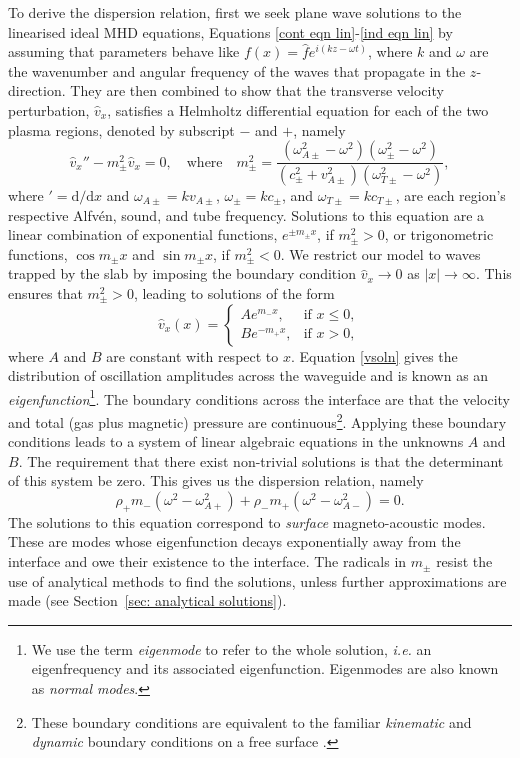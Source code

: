 To derive the dispersion relation, first we seek plane wave solutions to the linearised ideal MHD equations, Equations \eqref{cont eqn lin}-\eqref{ind eqn lin} by assuming that parameters behave like $f(x) = \widehat{f}e^{i(kz - \omega t)}$, where $k$ and $\omega$ are the wavenumber and angular frequency of the waves that propagate in the $z$-direction. They are then combined to show that the transverse velocity perturbation, $\widehat{v}_x$, satisfies a Helmholtz differential equation for each of the two plasma regions, denoted by subscript $-$ and $+$, namely
\begin{equation}
\widehat{v}_x'' - m_\pm^2\widehat{v}_x = 0, \quad \text{where} \quad
m_\pm^2 = \frac{(\omega_{A\pm}^2 - \omega^2)(\omega_\pm^2 - \omega^2)}{(c_\pm^2 + v_{A\pm}^2)(\omega_{T\pm}^2 - \omega^2)}, \label{ODE for v}
\end{equation}
where $'=\textrm{d}/\textrm{d}x$ and $\omega_{A\pm} = kv_{A\pm}$, $\omega_{\pm} = kc_{\pm}$, and $\omega_{T\pm} = kc_{T\pm}$, are each region's respective Alfv\'{e}n, sound, and tube frequency. Solutions to this equation are a linear combination of exponential functions, $e^{\pm m_\pm x}$, if $m_\pm^2 > 0$, or trigonometric functions, $\cos{m_\pm x}$ and $\sin{m_\pm x}$, if $m_\pm^2 < 0$. We restrict our model to waves trapped by the slab by imposing the boundary condition $\widehat{v}_x \to 0$ as $|x| \to \infty$. This ensures that $m_\pm^2 > 0$, leading to solutions of the form
\begin{equation}
\widehat{v}_x(x)=
\begin{cases}
Ae^{m_-x}, & \text{if } x \leq 0, \\
Be^{-m_+x}, & \text{if } x > 0,
\end{cases} \label{vsoln}
\end{equation}
where $A$ and $B$ are constant with respect to $x$. Equation \eqref{vsoln} gives the distribution of oscillation amplitudes across the waveguide and is known as an \textit{eigenfunction}\footnote{We use the term \textit{eigenmode} to refer to the whole solution, \textit{i.e.} an eigenfrequency and its associated eigenfunction. Eigenmodes are also known as \textit{normal modes}.}. The boundary conditions across the interface are that the velocity and total (gas plus magnetic) pressure are continuous\footnote{These boundary conditions are equivalent to the familiar \textit{kinematic} and \textit{dynamic} boundary conditions on a free surface \cite{goe_etal04}.}. Applying these boundary conditions leads to a system of linear algebraic equations in the unknowns $A$ and $B$. The requirement that there exist non-trivial solutions is that the determinant of this system be zero. This gives us the dispersion relation, namely
\begin{equation}
	\rho_+m_-(\omega^2 - \omega_{A+}^2) + \rho_-m_+(\omega^2 - \omega_{A-}^2) = 0. \label{DR interface}
\end{equation}
The solutions to this equation correspond to \textit{surface} magneto-acoustic modes. These are modes whose eigenfunction decays exponentially away from the interface and owe their existence to the interface. The radicals in $m_\pm$ resist the use of analytical methods to find the solutions, unless further approximations are made (see Section~\ref{sec: analytical solutions}).

